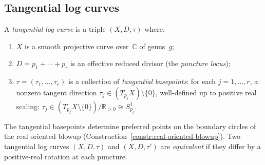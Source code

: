 \subsection{Tangential log curves}
\label{subsec:tangential-log-curves}

\begin{definition}
\label{def:tangential-log-curve}
A \emph{tangential log curve} is a triple $(X, D, \tau)$ where:
\begin{enumerate}[label=\textup{(\roman*)}]
\item $X$ is a smooth projective curve over~$\mathbb{C}$
  of genus~$g$;
\item $D = p_1 + \cdots + p_r$ is an effective reduced divisor
  (the \emph{puncture locus});
\item $\tau = (\tau_1, \ldots, \tau_r)$ is a collection of
  \emph{tangential basepoints}: for each $j = 1, \ldots, r$,
  a nonzero tangent direction
  $\tau_j \in (T_{p_j} X) \setminus \{0\}$, well-defined up to
  positive real scaling:
  $\tau_j \in (T_{p_j} X \setminus \{0\}) / \mathbb{R}_{>0}
  \cong S^1_{p_j}$.
\end{enumerate}
The tangential basepoints determine preferred points on the
boundary circles of the real oriented blowup
(Construction~\ref{constr:real-oriented-blowup}).  Two
tangential log curves $(X, D, \tau)$ and $(X, D, \tau')$ are
\emph{equivalent} if they differ by a positive-real rotation
at each puncture.
\end{definition}

